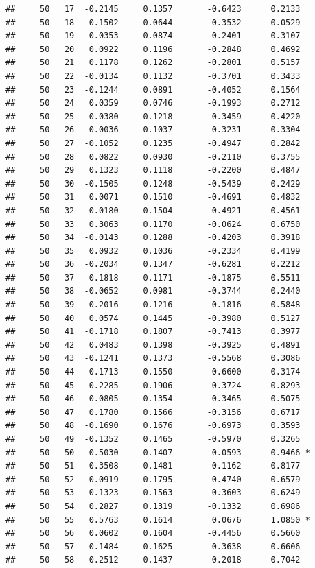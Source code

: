 \documentclass[
]{article}
\begin{document}
\begin{verbatim}
##     50   17  -0.2145     0.1357       -0.6423      0.2133  
##     50   18  -0.1502     0.0644       -0.3532      0.0529  
##     50   19   0.0353     0.0874       -0.2401      0.3107  
##     50   20   0.0922     0.1196       -0.2848      0.4692  
##     50   21   0.1178     0.1262       -0.2801      0.5157  
##     50   22  -0.0134     0.1132       -0.3701      0.3433  
##     50   23  -0.1244     0.0891       -0.4052      0.1564  
##     50   24   0.0359     0.0746       -0.1993      0.2712  
##     50   25   0.0380     0.1218       -0.3459      0.4220  
##     50   26   0.0036     0.1037       -0.3231      0.3304  
##     50   27  -0.1052     0.1235       -0.4947      0.2842  
##     50   28   0.0822     0.0930       -0.2110      0.3755  
##     50   29   0.1323     0.1118       -0.2200      0.4847  
##     50   30  -0.1505     0.1248       -0.5439      0.2429  
##     50   31   0.0071     0.1510       -0.4691      0.4832  
##     50   32  -0.0180     0.1504       -0.4921      0.4561  
##     50   33   0.3063     0.1170       -0.0624      0.6750  
##     50   34  -0.0143     0.1288       -0.4203      0.3918  
##     50   35   0.0932     0.1036       -0.2334      0.4199  
##     50   36  -0.2034     0.1347       -0.6281      0.2212  
##     50   37   0.1818     0.1171       -0.1875      0.5511  
##     50   38  -0.0652     0.0981       -0.3744      0.2440  
##     50   39   0.2016     0.1216       -0.1816      0.5848  
##     50   40   0.0574     0.1445       -0.3980      0.5127  
##     50   41  -0.1718     0.1807       -0.7413      0.3977  
##     50   42   0.0483     0.1398       -0.3925      0.4891  
##     50   43  -0.1241     0.1373       -0.5568      0.3086  
##     50   44  -0.1713     0.1550       -0.6600      0.3174  
##     50   45   0.2285     0.1906       -0.3724      0.8293  
##     50   46   0.0805     0.1354       -0.3465      0.5075  
##     50   47   0.1780     0.1566       -0.3156      0.6717  
##     50   48  -0.1690     0.1676       -0.6973      0.3593  
##     50   49  -0.1352     0.1465       -0.5970      0.3265  
##     50   50   0.5030     0.1407        0.0593      0.9466 *
##     50   51   0.3508     0.1481       -0.1162      0.8177  
##     50   52   0.0919     0.1795       -0.4740      0.6579  
##     50   53   0.1323     0.1563       -0.3603      0.6249  
##     50   54   0.2827     0.1319       -0.1332      0.6986  
##     50   55   0.5763     0.1614        0.0676      1.0850 *
##     50   56   0.0602     0.1604       -0.4456      0.5660  
##     50   57   0.1484     0.1625       -0.3638      0.6606  
##     50   58   0.2512     0.1437       -0.2018      0.7042  

\end{verbatim}
\end{document}
